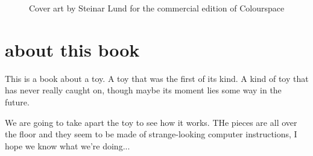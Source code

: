 \begin{figure}[H]
    \centering
    \begin{adjustbox}{width=12cm,center}
    \end{adjustbox}
\caption{Cover art by Steinar Lund for the commercial edition of Colourspace}
\end{figure}
\clearpage
\chapter*{about this book} 
This is a book about a toy. A toy that was the first of its kind. A kind of toy that has never really caught on,
though maybe its moment lies some way in the future. 

We are going to take apart the toy to see how it works. THe pieces are all over the floor and they seem to be made
of strange-looking computer instructions, I hope we know what we're doing...



